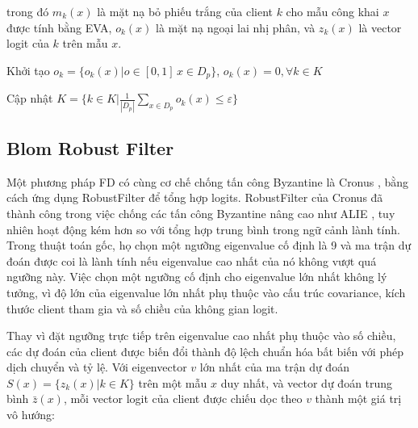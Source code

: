 trong đó $m_k(x)$ là mặt nạ bỏ phiếu trắng của client $k$ cho mẫu công khai $x$ được tính bằng EVA, $o_k(x)$ là mặt nạ ngoại lai nhị phân, và $z_k(x)$ là vector logit của $k$ trên mẫu $x$.

\begin{algorithm}[H]
\label{alg:RobustFusion}
\caption{Robust Logit Fusion}

Khởi tạo $o_k = \{o_k(x)|o \in [0,1]\,x \in D_p\}$, $o_k(x)=0, \forall k \in K$\;


Cập nhật $K = \{k \in K | \frac{1}{|D_p|}\sum_{x \in D_p}o_k(x) \leq \varepsilon\}$ \;

\end{algorithm}

\subsection{Blom Robust Filter}
\label{sub:blom_spectral}

Một phương pháp FD có cùng cơ chế chống tấn công Byzantine là Cronus \cite{chang2019cronus}, bằng cách ứng dụng RobustFilter \cite{diakonikolas2017robustfilter} để tổng hợp logits. RobustFilter của Cronus đã thành công trong việc chống các tấn công Byzantine nâng cao như ALIE \cite{baruch2019little}, tuy nhiên hoạt động kém hơn so với tổng hợp trung bình trong ngữ cảnh lành tính. Trong thuật toán gốc, họ chọn một ngưỡng eigenvalue cố định là 9 và ma trận dự đoán được coi là lành tính nếu eigenvalue cao nhất của nó không vượt quá ngưỡng này. Việc chọn một ngưỡng cố định cho eigenvalue lớn nhất không lý tưởng, vì độ lớn của eigenvalue lớn nhất phụ thuộc vào cấu trúc covariance, kích thước client tham gia và số chiều của không gian logit.

Thay vì đặt ngưỡng trực tiếp trên eigenvalue cao nhất phụ thuộc vào số chiều, các dự đoán của client được biến đổi thành độ lệch chuẩn hóa bất biến với phép dịch chuyển và tỷ lệ. Với eigenvector $v$ lớn nhất của ma trận dự đoán $S(x) = \{z_k(x)|k \in K\}$ trên một mẫu $x$ duy nhất, và vector dự đoán trung bình $\bar z(x)$, mỗi vector logit của client được chiếu dọc theo $v$ thành một giá trị vô hướng:

